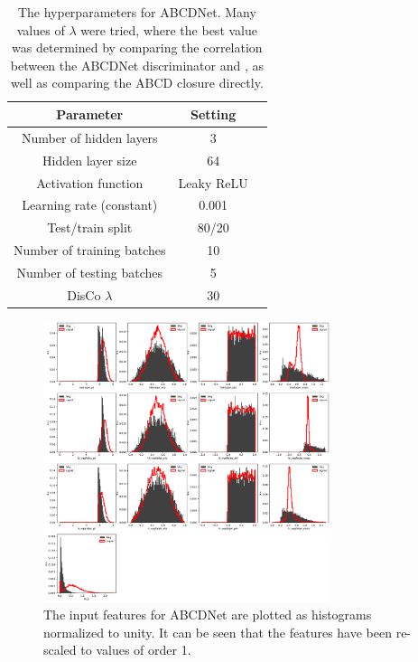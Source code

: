 \begin{table}[htbp]
    \centering
    \caption[ABCDNet hyperparameters]{
        The hyperparameters for ABCDNet. 
        Many values of $\lambda$ were tried, where the best value was determined by comparing the correlation between the ABCDNet discriminator and \detajj, as well as comparing the ABCD closure directly. 
    }
    \begin{tabular}{ccc}
    \toprule
    Parameter & Setting \\
    \midrule
    Number of hidden layers    & 3          \\
    Hidden layer size          & 64         \\
    Activation function        & Leaky ReLU \\
    Learning rate (constant)   & 0.001      \\
    Test/train split           & 80/20      \\
    Number of training batches & 10         \\
    Number of testing batches  & 5          \\
    DisCo $\lambda$            & 30         \\
    \bottomrule
    \end{tabular}
    \label{tab:vbsvvh_abcdnet_params}
\end{table}

\begin{figure}[htb]
    \centering
    \includegraphics[width=0.75\textwidth]{fig/vbsvvh/all_features.pdf}
    \caption{
        The input features for ABCDNet are plotted as histograms normalized to unity. 
        It can be seen that the features have been re-scaled to values of order 1.
    }
    \label{fig:vbsvvh_abcdnet_inputs}
\end{figure}

